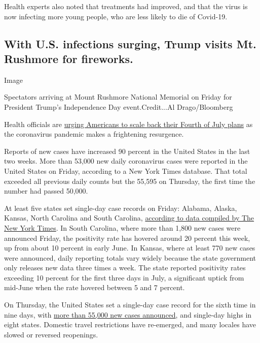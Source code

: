 Health experts also noted that treatments had improved, and that the
virus is now infecting more young people, who are less likely to die of
Covid-19.

\hypertarget{with-us-infections-surging-trump-visits-mt-rushmore-for-fireworks}{%
\subsection{With U.S. infections surging, Trump visits Mt. Rushmore for
fireworks.}\label{with-us-infections-surging-trump-visits-mt-rushmore-for-fireworks}}

Image

Spectators arriving at Mount Rushmore National Memorial on Friday for
President Trump's Independence Day event.Credit...Al Drago/Bloomberg

Health officials are
\href{https://www.nytimes3xbfgragh.onion/2020/07/02/us/coronavirus-fourth-of-july.html?action=click\&module=Top\%20Stories\&pgtype=Homepage}{urging
Americans to scale back their Fourth of July plans} as the coronavirus
pandemic makes a frightening resurgence.

Reports of new cases have increased 90 percent in the United States in
the last two weeks. More than 53,000 new daily coronavirus cases were
reported in the United States on Friday, according to a New York Times
database. That total exceeded all previous daily counts but the 55,595
on Thursday, the first time the number had passed 50,000.

At least five states set single-day case records on Friday: Alabama,
Alaska, Kansas, North Carolina and South Carolina,
\href{https://www.nytimes3xbfgragh.onion/interactive/2020/us/coronavirus-us-cases.html}{according
to data compiled by The New York Times}. In South Carolina, where more
than 1,800 new cases were announced Friday, the positivity rate has
hovered around 20 percent this week, up from about 10 percent in early
June. In Kansas, where at least 770 new cases were announced, daily
reporting totals vary widely because the state government only releases
new data three times a week. The state reported positivity rates
exceeding 10 percent for the first three days in July, a significant
uptick from mid-June when the rate hovered between 5 and 7 percent.

On Thursday, the United States set a single-day case record for the
sixth time in nine days, with
\href{https://www.nytimes3xbfgragh.onion/interactive/2020/us/coronavirus-us-cases.html}{more
than 55,000 new cases announced}, and single-day highs in eight states.
Domestic travel restrictions have re-emerged, and many locales have
slowed or reversed reopenings.


